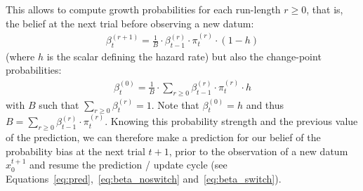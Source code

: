 \documentclass[12pt,english]{article}%
\newcommand{\eqa}[1]{\begin{align}#1\end{align}}
\begin{document}
This allows to compute growth probabilities for each run-length $r \geq 0$,
that is, the belief at the next trial before observing a new datum:
\eqa{
\beta^{(r+1)}_t = \frac{1}{B} \cdot \beta^{(r)}_{t-1} \cdot \pi^{(r)}_{t} \cdot (1-h)
\label{eq:beta_noswitch}
}
(where $h$ is the scalar defining the hazard rate)
but also the change-point probabilities:
\eqa{
\beta^{(0)}_t  = \frac{1}{B} \cdot \sum_{r \geq 0} \beta^{(r)}_{t-1} \cdot \pi^{(r)}_{t} \cdot h
\label{eq:beta_switch}
}
with $B$ such that $\sum_{r \geq 0} \beta^{(r)}_{t} = 1$.
Note that $\beta^{(0)}_t=h$ and thus $B=\sum_{r \geq 0} \beta^{(r)}_{t-1} \cdot \pi^{(r)}_{t}$.
Knowing this probability strength and the previous value of the prediction, %
we can therefore make a prediction for our belief of the probability bias at the next trial $t+1$,
prior to the observation of a new datum $x_0^{t+1}$ and resume the prediction / update cycle (see Equations~\ref{eq:pred},~\ref{eq:beta_noswitch} and~\ref{eq:beta_switch}).
\end{document}
